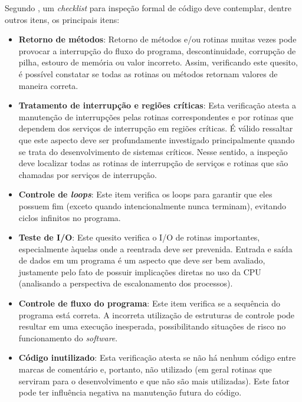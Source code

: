 Segundo \cite{inspecao1}, um \textit{checklist} para inspeção formal de código deve contemplar, dentre outros itens, os principais itens:

\begin{itemize}
	\item \textbf{Retorno de métodos}: Retorno de métodos e/ou rotinas muitas vezes pode provocar a interrupção do fluxo do programa, descontinuidade, corrupção de pilha, estouro de memória ou valor incorreto. Assim, verificando este quesito, é possível constatar se todas as rotinas ou métodos retornam valores de maneira correta.

	\item \textbf{Tratamento de interrupção e regiões críticas}: Esta verificação atesta a manutenção de interrupções pelas rotinas correspondentes e por rotinas que dependem dos serviços de interrupção em regiões críticas. É válido ressaltar que este aspecto deve ser profundamente investigado principalmente quando se trata do desenvolvimento de sistemas críticos. Nesse sentido, a inspeção deve localizar todas as rotinas de interrupção de serviços e rotinas que são chamadas por serviços de interrupção.

	\item \textbf{Controle de \textit{loops}}: Este item verifica os loops para garantir que eles possuem fim (exceto quando intencionalmente nunca terminam), evitando ciclos infinitos no programa.

	\item \textbf{Teste de I/O}: Este quesito verifica o I/O de rotinas importantes, especialmente àquelas onde a reentrada deve ser prevenida. Entrada e saída de dados em um programa é um aspecto que deve ser bem avaliado, justamente pelo fato de possuir implicações diretas no uso da CPU (analisando a perspectiva de escalonamento dos processos).

	\item \textbf{Controle de fluxo do programa}: Este item verifica se a sequência do programa está correta. A incorreta utilização de estruturas de controle pode resultar em uma execução inesperada, possibilitando situações de risco no funcionamento do \textit{software}.

	\item \textbf{Código inutilizado}: Esta verificação atesta se não há nenhum código entre marcas de comentário e, portanto, não utilizado (em geral rotinas que serviram para o desenvolvimento e que não são mais utilizadas). Este fator pode ter influência negativa na manutenção futura do código.


\end{itemize}
